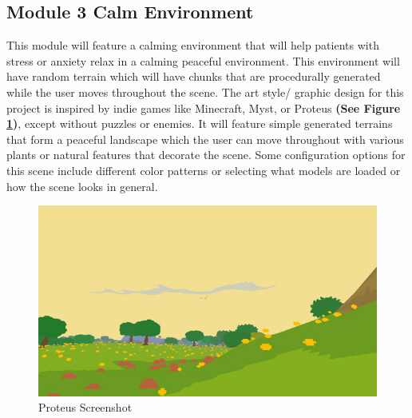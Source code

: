 \documentclass[a4paper,10pt]{article}
\begin{document}
\subsection{Module 3 Calm Environment} %
This module will feature a calming environment that will help patients with stress or anxiety relax in a calming peaceful environment. This environment will have random terrain which will have chunks that are procedurally generated while the user moves throughout the scene.  The art style/ graphic design for this project is inspired by indie games like Minecraft, Myst, or Proteus \textbf{(See Figure \ref{fig:proteus})}, except without puzzles or enemies. It will feature simple generated terrains that form a  peaceful landscape which the user can move throughout with various plants or natural features that decorate the scene.  Some configuration options for this scene include different color patterns or selecting what models are loaded or how the scene looks in general. 

\begin{figure}[H]
	\centerline{\includegraphics[scale= 0.4]{proteus.jpg}}
	\caption{Proteus Screenshot}
	\label{fig:proteus}
\end{figure}
\end{document}
